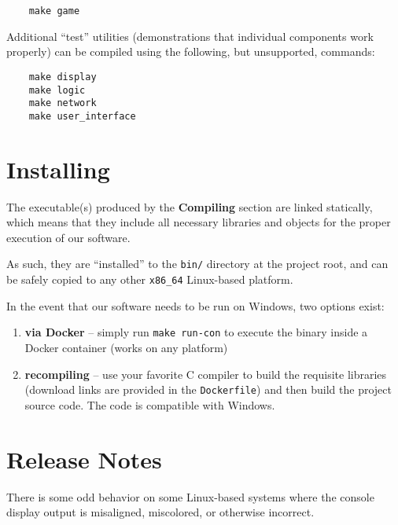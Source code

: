 \documentclass[letterpaper]{article}
\begin{document}
\lstset{frame=none}
\begin{lstlisting}
    make game
\end{lstlisting}

Additional ``test'' utilities (demonstrations that individual
components work properly) can be compiled using the following,
but unsupported, commands:

\begin{lstlisting}
    make display
    make logic
    make network
    make user_interface
\end{lstlisting}


\section{Installing}

The executable(s) produced by the \textbf{Compiling} section are
linked statically, which means that they include all necessary
libraries and objects for the proper execution of our software.

As such, they are ``installed'' to the \texttt{bin/} directory
at the project root, and can be safely copied to any other
\texttt{x86\_64} Linux-based platform.

In the event that our software needs to be run on Windows, two
options exist:

\begin{enumerate}
    \item \textbf{via Docker} -- simply run
          \texttt{make run-con} to execute the binary inside a
          Docker container (works on any platform)
    \item \textbf{recompiling} -- use your favorite C compiler
          to build the requisite libraries (download links are
          provided in the \texttt{Dockerfile}) and then build
          the project source code. The code is compatible with
          Windows.
\end{enumerate}


\section{Release Notes}

There is some odd behavior on some Linux-based systems where the
console display output is misaligned, miscolored, or otherwise
incorrect.
\end{document}
